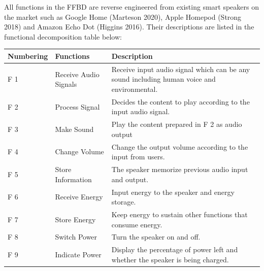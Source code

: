 \documentclass{article}
\begin{document}
All functions in the FFBD are reverse engineered from existing smart speakers on the market such as Google Home (Marteson 2020), Apple Homepod (Strong 2018) and Amazon Echo Dot  (Higgins 2016). Their descriptions are listed in the functional decomposition table below:
\begin{center}
\begin{longtable}{| m{} | m{} | m{} |} 
 \hline
 Numbering & Functions & Description \\ 
 \hline\hline
 F 1 & Receive Audio Signals & Receive input audio signal which can be any sound including human voice and environmental.\\ 
 \hline
 F 2 & Process Signal & Decides the content to play according to the input audio signal. \\ 
 \hline
 F 3 & Make Sound & Play the content prepared in F 2 as audio output\\ 
 \hline
 F 4 & Change Volume & Change the output volume according to the input from users.\\ 
 \hline
 F 5 & Store Information & The speaker memorize previous audio input and output.\\ 
 \hline
 F 6 & Receive Energy & Input energy to the speaker and energy storage.\\ 
 \hline
 F 7 & Store Energy & Keep energy to sustain other functions that consume energy.\\ 
 \hline
 F 8 & Switch Power & Turn the speaker on and off.\\ 
 \hline
 F 9 & Indicate Power & Display the percentage of power left and whether the speaker is being charged.\\ 
 \hline
 

\end{longtable}
\end{center}
\end{document}

